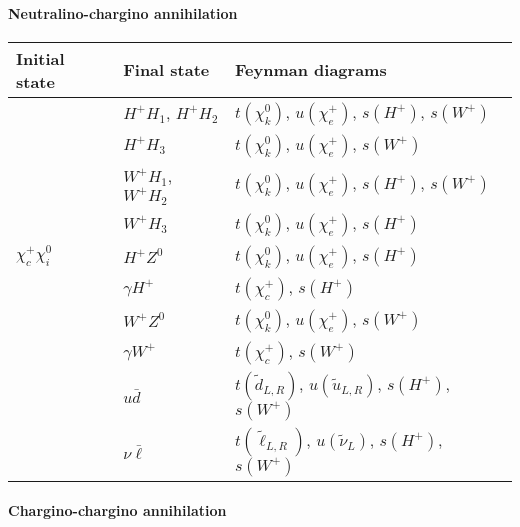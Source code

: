 \paragraph{Neutralino-chargino annihilation}

\begin{center}
\begin{tabular}{lll} \hline 
  Initial state & Final state & Feynman diagrams \\ \hline \tabspace
   & $H^+ H_1$, $H^+ H_2$ &
  $t(\chi_k^0)$, $u(\chi_e^+)$, $s(H^+)$, $s(W^+)$ \\
   & $H^+ H_3$ &
  $t(\chi_k^0)$, $u(\chi_e^+)$, $s(W^+)$ \\
   & $W^+ H_1$, $W^+ H_2$ &
  $t(\chi_k^0)$, $u(\chi_e^+)$, $s(H^+)$, $s(W^+)$ \\
   & $W^+ H_3$ &
  $t(\chi_k^0)$, $u(\chi_e^+)$, $s(H^+)$ \\
  $\chi_c^+ \chi_i^0$ & $H^+ Z^0$ &
  $t(\chi_k^0)$, $u(\chi_e^+)$, $s(H^+)$ \\
   & $\gamma H^+$ &
  $t(\chi_c^+)$, $s(H^+)$ \\
   & $W^+ Z^0$ &
  $t(\chi_k^0)$, $u(\chi_e^+)$, $s(W^+)$ \\
   & $\gamma W^+$ &
  $t(\chi_c^+)$, $s(W^+)$ \\
   & $u \bar{d}$ &
  $t(\tilde{d}_{L,R})$, $u(\tilde{u}_{L,R})$, $s(H^+)$, $s(W^+)$ \\
   & $\nu \bar{\ell}$ &
  $t(\tilde{\ell}_{L,R})$, $u(\tilde{\nu}_{L})$, $s(H^+)$, $s(W^+)$
  \\ \hline
\end{tabular}
\end{center}


\paragraph{Chargino-chargino annihilation}

